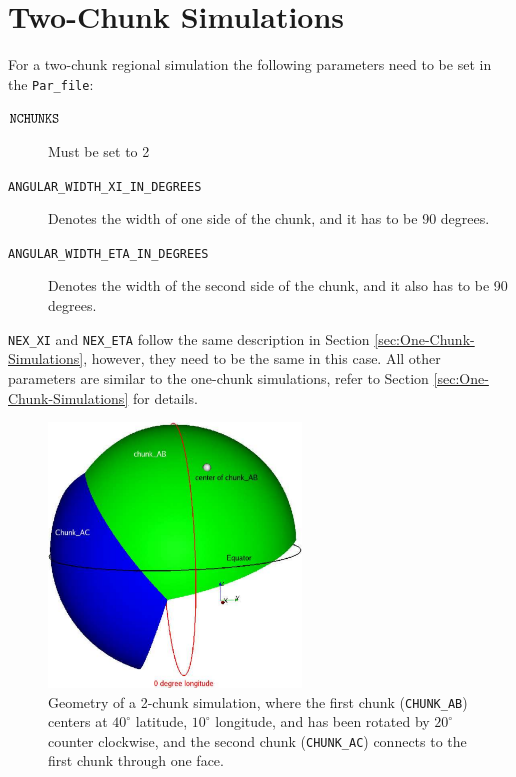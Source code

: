 \documentclass[oneside,english]{book}
\newcommand{\nchunks}{\mbox{\texttt{NCHUNKS}}}
\begin{document}
\section{Two-Chunk Simulations}

For a two-chunk regional simulation the following parameters need
to be set in the \texttt{Par\_file}:

\begin{description}
\item [{$\nchunks$}] Must be set to 2
\item [{\texttt{ANGULAR\_WIDTH\_XI\_IN\_DEGREES}}] Denotes the width of
one side of the chunk, and it has to be 90 degrees.
\item [{\texttt{ANGULAR\_WIDTH\_ETA\_IN\_DEGREES}}] Denotes the width of
the second side of the chunk, and it also has to be 90 degrees.
\end{description}
\texttt{NEX\_XI} and \texttt{NEX\_ETA} follow the same description
in Section \ref{sec:One-Chunk-Simulations}, however, they need to
be the same in this case. All other parameters are similar to the
one-chunk simulations, refer to Section \ref{sec:One-Chunk-Simulations}
for details.

%
\begin{figure}[H]
\noindent \begin{centering}
\includegraphics[width=0.6\textwidth]{figures/2-chunk-surface}
\par\end{centering}

\caption{Geometry of a 2-chunk simulation, where the first chunk (\texttt{CHUNK\_AB})
centers at $40^{\circ}$ latitude, $10^{\circ}$ longitude, and has
been rotated by $20^{\circ}$ counter clockwise, and the second chunk
(\texttt{CHUNK\_AC}) connects to the first chunk through one face.}

\end{figure}
\end{document}
